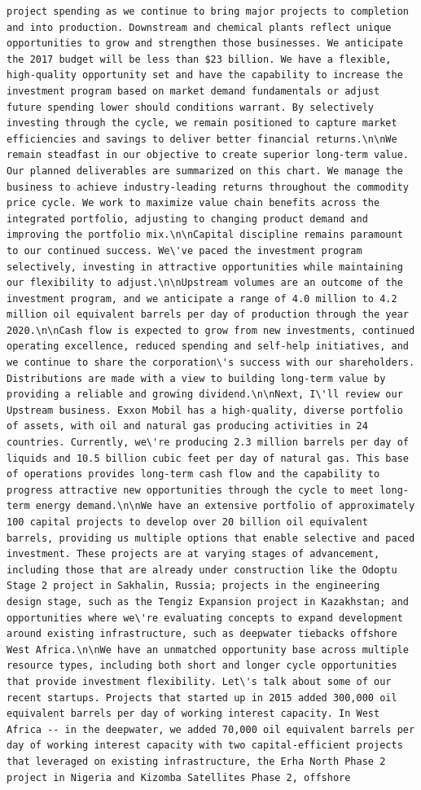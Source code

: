 \documentclass[
  letterpaper,
  DIV=11,
  numbers=noendperiod]{scrreprt}
\begin{document}
\begin{verbatim}
project spending as we continue to bring major projects to completion and into production. Downstream and chemical plants reflect unique opportunities to grow and strengthen those businesses. We anticipate the 2017 budget will be less than $23 billion. We have a flexible, high-quality opportunity set and have the capability to increase the investment program based on market demand fundamentals or adjust future spending lower should conditions warrant. By selectively investing through the cycle, we remain positioned to capture market efficiencies and savings to deliver better financial returns.\n\nWe remain steadfast in our objective to create superior long-term value. Our planned deliverables are summarized on this chart. We manage the business to achieve industry-leading returns throughout the commodity price cycle. We work to maximize value chain benefits across the integrated portfolio, adjusting to changing product demand and improving the portfolio mix.\n\nCapital discipline remains paramount to our continued success. We\'ve paced the investment program selectively, investing in attractive opportunities while maintaining our flexibility to adjust.\n\nUpstream volumes are an outcome of the investment program, and we anticipate a range of 4.0 million to 4.2 million oil equivalent barrels per day of production through the year 2020.\n\nCash flow is expected to grow from new investments, continued operating excellence, reduced spending and self-help initiatives, and we continue to share the corporation\'s success with our shareholders. Distributions are made with a view to building long-term value by providing a reliable and growing dividend.\n\nNext, I\'ll review our Upstream business. Exxon Mobil has a high-quality, diverse portfolio of assets, with oil and natural gas producing activities in 24 countries. Currently, we\'re producing 2.3 million barrels per day of liquids and 10.5 billion cubic feet per day of natural gas. This base of operations provides long-term cash flow and the capability to progress attractive new opportunities through the cycle to meet long-term energy demand.\n\nWe have an extensive portfolio of approximately 100 capital projects to develop over 20 billion oil equivalent barrels, providing us multiple options that enable selective and paced investment. These projects are at varying stages of advancement, including those that are already under construction like the Odoptu Stage 2 project in Sakhalin, Russia; projects in the engineering design stage, such as the Tengiz Expansion project in Kazakhstan; and opportunities where we\'re evaluating concepts to expand development around existing infrastructure, such as deepwater tiebacks offshore West Africa.\n\nWe have an unmatched opportunity base across multiple resource types, including both short and longer cycle opportunities that provide investment flexibility. Let\'s talk about some of our recent startups. Projects that started up in 2015 added 300,000 oil equivalent barrels per day of working interest capacity. In West Africa -- in the deepwater, we added 70,000 oil equivalent barrels per day of working interest capacity with two capital-efficient projects that leveraged on existing infrastructure, the Erha North Phase 2 project in Nigeria and Kizomba Satellites Phase 2, offshore 
\end{verbatim}
\end{document}
